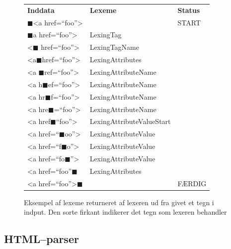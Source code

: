\documentclass[a4paper,oneside]{memoir}
\begin{document}
\begin{figure}[h]
  \begin{tabular}{lll}
\textbf{Inddata} &
\textbf{Lexeme} & 
\textbf{Status}\\

$\blacksquare$<a href=``foo''> & & START  \\
\hspace*{10pt}$\blacksquare$a href=``foo''> & LexingTag & \\
\hspace*{10pt}<$\blacksquare$ href=``foo''> & LexingTagName & \\
\hspace*{10pt}<a$\blacksquare$href=``foo''> & LexingAttributes & \\
\hspace*{10pt}<a $\blacksquare$ref=``foo''> & LexingAttributeName & \\
\hspace*{10pt}<a h$\blacksquare$ef=``foo''> & LexingAttributeName & \\
\hspace*{10pt}<a hr$\blacksquare$f=``foo''> & LexingAttributeName & \\
\hspace*{10pt}<a hre$\blacksquare$=``foo''> & LexingAttributeName & \\
\hspace*{10pt}<a href$\blacksquare$``foo''> & LexingAttributeValueStart & \\
\hspace*{10pt}<a href=``$\blacksquare$oo''> & LexingAttributeValue & \\
\hspace*{10pt}<a href=``f$\blacksquare$o''> & LexingAttributeValue & \\
\hspace*{10pt}<a href=``fo$\blacksquare$''> & LexingAttributeValue & \\
\hspace*{10pt}<a href=``foo''$\blacksquare$ & LexingAttributes & \\
\hspace*{10pt}<a href=``foo''>$\blacksquare$ & & FÆRDIG\\
\end{tabular}
  \caption{Eksempel af lexeme returneret af lexeren ud fra givet et tegn
i indput. Den sorte firkant indikerer det tegn som lexeren behandler}
  \label{ekslexeroutput}
\end{figure}

\subsection{HTML--parser}
\end{document}
